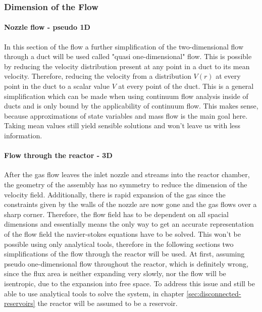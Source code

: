 \subsubsection*{Dimension of the Flow}

	\paragraph{Nozzle flow - pseudo 1D}
		In this section of the flow a further simplification of the two-dimensional flow through a duct will be used called "quasi one-dimensional" flow.
		This is possible by reducing the velocity distribution present at any point in a duct to its mean velocity.
		Therefore, reducing the velocity from a distribution $V(r)$ at every point in the duct to a scalar value $V$ at every point of the duct.
		This is a general simplification which can be made when using continuum flow analysis inside of ducts and is only bound by the applicability of continuum flow.
		This makes sense, because approximations of state variables and mass flow is the main goal here.
		Taking mean values still yield sensible solutions and won't leave us with less information.

	\paragraph*{Flow through the reactor - 3D}
		After the gas flow leaves the inlet nozzle and streams into the reactor chamber, the geometry of the assembly has no symmetry to reduce the dimension of the velocity field.
		Additionally, there is rapid expansion of the gas since the constraints given by the walls of the nozzle are now gone and the gas flows over a sharp corner.
		Therefore, the flow field has to be dependent on all spacial dimensions and essentially means the only way to get an accurate representation of the flow field the navier-stokes equations have to be solved.
		This won't be possible using only analytical tools, therefore in the following sections two simplifications of the flow through the reactor will be used.
		At first, assuming pseudo one-dimensional flow throughout the reactor, which is definitely wrong, since the flux area is neither expanding very slowly, nor the flow will be isentropic, due to the expansion into free space.
		To address this issue and still be able to use analytical tools to solve the system, in chapter \ref{sec:disconnected-reservoirs} the reactor will be assumed to be a reservoir.


